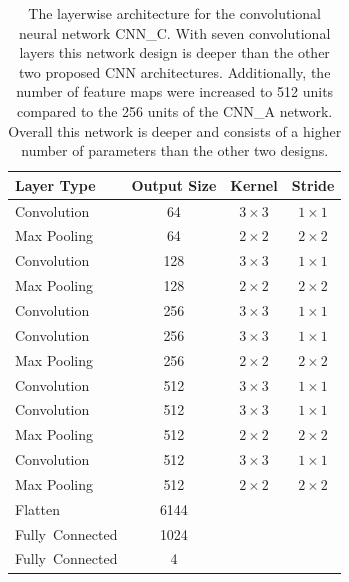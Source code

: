   \begin{table}[]
  \centering
  \begin{tabularx}{\textwidth}{Xccc}
  \toprule
Layer Type              & Output Size  & Kernel & Stride \\ \midrule
Convolution             & 64     & $3\times3$    & $1\times1$  \\ 
Max Pooling             & 64     & $2\times2$    & $2\times2$  \\ 
Convolution             & 128    & $3\times3$    & $1\times1$  \\ 
Max Pooling             & 128    & $2\times2$    & $2\times2$  \\ 
Convolution             & 256    & $3\times3$    & $1\times1$  \\ 
Convolution             & 256    & $3\times3$    & $1\times1$  \\ 
Max Pooling             & 256    & $2\times2$    & $2\times2$  \\ 
Convolution             & 512    & $3\times3$    & $1\times1$  \\ 
Convolution             & 512    & $3\times3$    & $1\times1$  \\ 
Max Pooling             & 512    & $2\times2$    & $2\times2$  \\ 
Convolution             & 512    & $3\times3$    & $1\times1$  \\ 
Max Pooling             & 512    & $2\times2$    & $2\times2$  \\ 
Flatten                 & 6144   &               &             \\
\mbox{Fully Connected}  & 1024   &               &             \\
\mbox{Fully Connected}  & 4      &               &             \\
  \bottomrule
  \end{tabularx}
  \caption{The layerwise architecture for the convolutional neural network CNN\_C. With seven convolutional layers this network design is deeper than the other two proposed CNN architectures. Additionally, the number of feature maps were increased to 512 units compared to the 256 units of the CNN\_A network. Overall this network is deeper and consists of a higher number of parameters than the other two designs.}
  \label{tab:layers_CNN_C}
  \end{table} 
    
